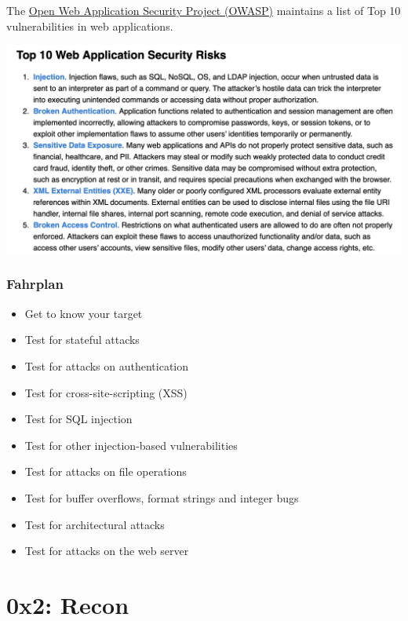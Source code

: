 \documentclass[aspectratio=169]{beamer}
\begin{document}
\begin{frame}

    The \href{https://owasp.org/www-project-top-ten/}{Open Web Application Security Project (OWASP)} maintains a list of Top 10 vulnerabilities in web applications.

    \begin{center}
        \includegraphics[scale=.35,angle=2]{img/owasp-top10.png}    
    \end{center}
\end{frame}

\begin{frame}
    \frametitle{Fahrplan}

    \begin{itemize}
        \item Get to know your target
        \item Test for stateful attacks
        \item Test for attacks on authentication
        \item Test for cross-site-scripting (XSS)
        \item Test for SQL injection
        \item Test for other injection-based vulnerabilities
        \item Test for attacks on file operations
        \item Test for buffer overflows, format strings and integer bugs
        \item Test for architectural attacks
        \item Test for attacks on the web server 
    \end{itemize}

\end{frame}

\section{0x2: Recon}
\end{document}

